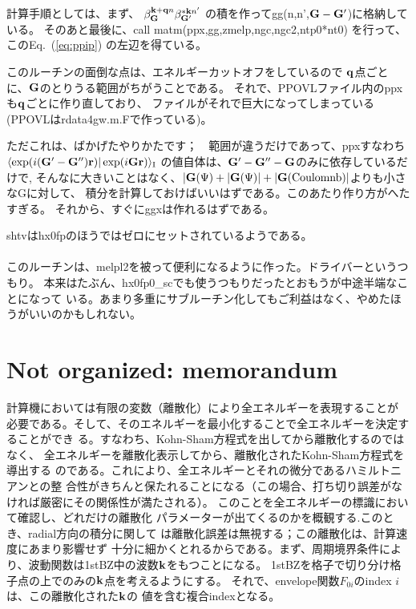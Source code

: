 \documentclass[a4paper,10pt,aip,onecolumn,amsmath,amssymb,floatfix,rmp]{revtex4-1}
\newcommand{\bfq}{{\bf q}}
\newcommand{\bfk}{{\bf k}}
\newcommand{\bfr}{{\bf r}}
\newcommand{\bfG}{{\bf G}}
\newcommand{\req}[1]{\mbox{Eq.~\!(\ref{#1})}}
\begin{document}
計算手順としては、まず、
$\beta^{\bfk+\bfq n}_{\bfG} \beta^{* \bfk n'}_{\bfG'}$
の積を作ってgg(n,n',$\bfG-\bfG'$)に格納している。
そのあと最後に、call matm(ppx,gg,zmelp,ngc,ngc2,ntp0*nt0)
を行って、この\req{eq:ppip} の左辺を得ている。

このルーチンの面倒な点は、エネルギーカットオフをしているので
$\bfq$点ごとに、$\bfG$のとりうる範囲がちがうことである。
それで、PPOVLファイル内のppxも$\bfq$ごとに作り直しており、
ファイルがそれで巨大になってしまっている(PPOVLはrdata4gw.m.Fで作っている)。

ただこれは、ばかげたやりかたです；　範囲が違うだけであって、ppxすなわち
$\langle \exp(i (\bfG'- \bfG'')\bfr) |\exp(i \bfG\bfr)\rangle_{\rm I}$
の値自体は、$\bfG'- \bfG''-\bfG$のみに依存しているだけで,
そんなに大きいことはなく、$|\bfG(\Psi)+|\bfG(\Psi)|+|\bfG({\rm Coulomnb})|$よりも小さなGに対して、
積分を計算しておけばいいはずである。このあたり作り方がへたすぎる。
それから、すぐにggxは作れるはずである。

shtvはhx0fpのほうではゼロにセットされているようである。\\

\\
このルーチンは、melpl2を被って便利になるように作った。ドライバーというつもり。
本来はたぶん、hx0fp0\_scでも使うつもりだったとおもうが中途半端なことになって
いる。あまり多重にサブルーチン化してもご利益はなく、やめたほうがいいのかもしれない。


\section{Not organized: memorandum}
計算機においては有限の変数（離散化）により全エネルギーを表現することが
必要である。そして、そのエネルギーを最小化することで全エネルギーを決定することができ
る。すなわち、Kohn-Sham方程式を出してから離散化するのではなく、
全エネルギーを離散化表示してから、離散化されたKohn-Sham方程式を導出する
のである。これにより、全エネルギーとそれの微分であるハミルトニアンとの整
合性がきちんと保たれることになる（この場合、打ち切り誤差がなければ厳密にその関係性が満たされる）。
このことを全エネルギーの標識において確認し、どれだけの離散化
パラメーターが出てくるのかを概観する.このとき、radial方向の積分に関して
は離散化誤差は無視する；この離散化は、計算速度にあまり影響せず
十分に細かくとれるからである。まず、周期境界条件により、波動関数は1stBZ中の波数$\bfk$をもつことになる。
1stBZを格子で切り分け格子点の上でのみの$\bfk$点を考えるようにする。
それで、envelope関数$F_{0i}$のindex $i$は、この離散化された$\bfk$の
値を含む複合indexとなる。
\end{document}
